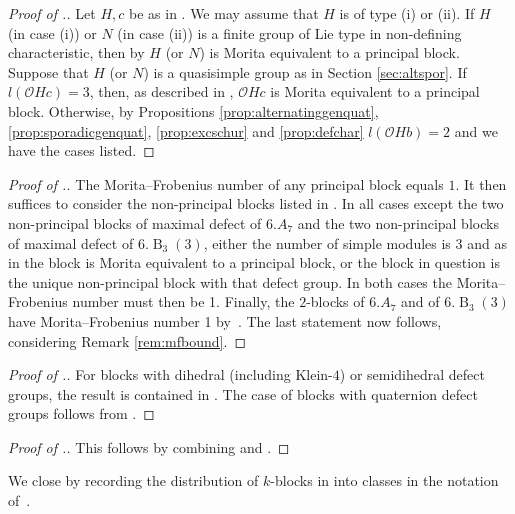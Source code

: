 \documentclass{amsart}
\theoremstyle{plain}\newtheorem{Theorem}{Theorem}[section]
\theoremstyle{plain}\newtheorem{Conjecture}[Theorem]{Conjecture}
\theoremstyle{plain}\newtheorem{Corollary}[Theorem]{Corollary}
\theoremstyle{plain}\newtheorem{Lemma}[Theorem]{Lemma}
\theoremstyle{plain}\newtheorem{Proposition}[Theorem]{Proposition}
\theoremstyle{definition}\newtheorem{Definition}[Theorem]{Definition}
\theoremstyle{definition}\newtheorem{Example}[Theorem]{Example}
\theoremstyle{definition}\newtheorem{Examples}[Theorem]{Examples}
\theoremstyle{definition}\newtheorem{Exercise}[Theorem]{Exercise}
\theoremstyle{definition}\newtheorem{Notation}[Theorem]{Notation}
\theoremstyle{definition}\newtheorem{Remark}[Theorem]{Remark}
\theoremstyle{definition}\newtheorem{Remarks}[Theorem]{Remarks}
\def\CO{{\mathcal{O}}}    \def\OPE{{\mathcal{O}(P\rtimes E)}}
\newcommand{\type}{\operatorname}
\newcommand{\alt}{{A}}
\numberwithin{equation}{section}
\begin{document}
\begin{proof}[Proof  of .] Let $H,c $ be  as in .  We may assume that $H$ is of type (i) or (ii). If $H$ (in case (i)) or $N$ (in case (ii)) is a finite group of Lie type in non-defining characteristic, then by  $H$ (or $N$) is Morita equivalent to a principal block. Suppose that $H$ (or $N$) is a quasisimple  group  as in  Section \ref{sec:altspor}. If $l(\CO Hc)=3$, then, as described in , $\CO Hc$ is Morita equivalent to a principal block. Otherwise, by Propositions \ref{prop:alternatinggenquat}, \ref{prop:sporadicgenquat},  \ref{prop:excschur} and \ref{prop:defchar} $l(\CO Hb)=2$ and we have the cases listed.
\end{proof}

\begin{proof}[Proof of .] The Morita--Frobenius number  of any principal  block  equals $1$. It then suffices to consider the non-principal  blocks  listed in . In all cases except the two non-principal blocks of maximal defect of $6.\alt_7$ and the two non-principal blocks of maximal defect of $6.\type{B}_3(3)$, either the number of simple modules is 3 and as in  the block is Morita equivalent to a principal block, or the block in question is the unique non-principal block with that defect group. In both cases the Morita--Frobenius number must then be 1. Finally, the $2$-blocks of $6.\alt_7$ and of $6.\type{B}_3(3)$ have Morita--Frobenius number 1 by~\cite[Prop.~7.2]{FK}. The last statement now follows, considering Remark \ref{rem:mfbound}.
\end{proof}

 \begin{proof}[Proof of .]   For  blocks with dihedral (including Klein-$4$) or semidihedral defect groups, the result is contained in \cite{er90}. The  case of blocks with quaternion defect groups  follows  from .
 \end{proof}


 \begin{proof}[Proof of .]  This follows by combining  and \cite[Thm.~1.1]{kl20}.\end{proof}

We close by recording the distribution of $k$-blocks in  into classes in the notation of~\cite{er90}. 
\end{document}
